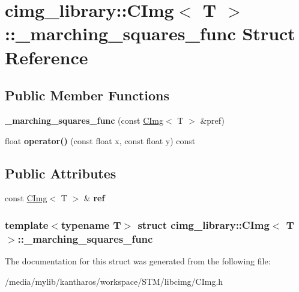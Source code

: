 \hypertarget{structcimg__library_1_1_c_img_1_1__marching__squares__func}{
\section{cimg\_\-library::CImg$<$ T $>$::\_\-marching\_\-squares\_\-func Struct Reference}
\label{structcimg__library_1_1_c_img_1_1__marching__squares__func}
}
\subsection*{Public Member Functions}
\begin{DoxyCompactItemize}
\item 
\hypertarget{structcimg__library_1_1_c_img_1_1__marching__squares__func_a85354185fd6b71ffb63e44146d811887}{
{\bfseries \_\-marching\_\-squares\_\-func} (const \hyperlink{structcimg__library_1_1_c_img}{CImg}$<$ T $>$ \&pref)}
\label{structcimg__library_1_1_c_img_1_1__marching__squares__func_a85354185fd6b71ffb63e44146d811887}

\item 
\hypertarget{structcimg__library_1_1_c_img_1_1__marching__squares__func_aa857bfd84acce9b6748778f6bbcf0c23}{
float {\bfseries operator()} (const float x, const float y) const }
\label{structcimg__library_1_1_c_img_1_1__marching__squares__func_aa857bfd84acce9b6748778f6bbcf0c23}

\end{DoxyCompactItemize}
\subsection*{Public Attributes}
\begin{DoxyCompactItemize}
\item 
\hypertarget{structcimg__library_1_1_c_img_1_1__marching__squares__func_a011fd20127c3336f0285d7bf86d3e5ad}{
const \hyperlink{structcimg__library_1_1_c_img}{CImg}$<$ T $>$ \& {\bfseries ref}}
\label{structcimg__library_1_1_c_img_1_1__marching__squares__func_a011fd20127c3336f0285d7bf86d3e5ad}

\end{DoxyCompactItemize}
\subsubsection*{template$<$typename T$>$ struct cimg\_\-library::CImg$<$ T $>$::\_\-marching\_\-squares\_\-func}



The documentation for this struct was generated from the following file:\begin{DoxyCompactItemize}
\item 
/media/mylib/kantharos/workspace/STM/libcimg/CImg.h\end{DoxyCompactItemize}
